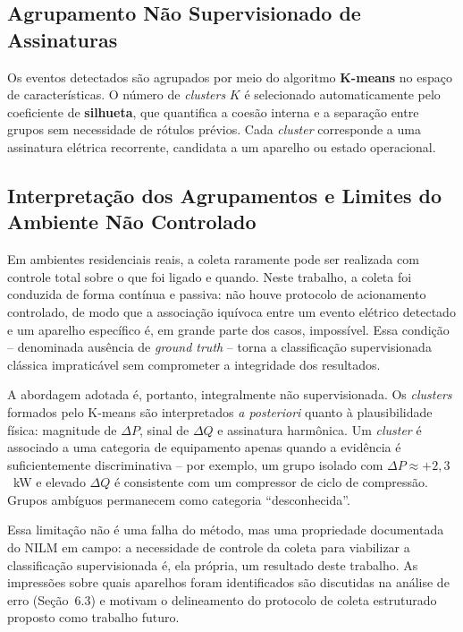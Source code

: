 \documentclass[12pt]{article}
\begin{document}
\subsection{Agrupamento N\~ao Supervisionado de Assinaturas}

Os eventos detectados s\~ao agrupados por meio do algoritmo \textbf{K-means} no
espa\c{c}o de caracter\'isticas. O n\'umero de \textit{clusters} $K$ \'e
selecionado automaticamente pelo coeficiente de \textbf{silhueta}, que quantifica
a coes\~ao interna e a separa\c{c}\~ao entre grupos sem necessidade de
r\'otulos pr\'evios. Cada \textit{cluster} corresponde a uma assinatura
el\'etrica recorrente, candidata a um aparelho ou estado operacional.

\subsection{Interpretação dos Agrupamentos e Limites do Ambiente N\~ao Controlado}

Em ambientes residenciais reais, a coleta raramente pode ser realizada com
controle total sobre o que foi ligado e quando. Neste trabalho, a coleta foi
conduzida de forma cont\'inua e passiva: n\~ao houve protocolo de acionamento
controlado, de modo que a associa\c{c}\~ao iqu\'ivoca entre um evento el\'etrico
detectado e um aparelho espec\'ifico \'e, em grande parte dos casos, imposs\'ivel.
Essa condi\c{c}\~ao -- denominada aus\^encia de \textit{ground truth} -- torna a
classifica\c{c}\~ao supervisionada cl\'assica impratic\'avel sem comprometer a
integridade dos resultados.

A abordagem adotada \'e, portanto, integralmente n\~ao supervisionada. Os
\textit{clusters} formados pelo K-means s\~ao interpretados \textit{a posteriori}
quanto \`a plausibilidade f\'isica: magnitude de $\Delta P$, sinal de $\Delta Q$
e assinatura harm\^onica. Um \textit{cluster} \'e associado a uma categoria de
equipamento apenas quando a evid\^encia \'e suficientemente discriminativa -- por
exemplo, um grupo isolado com $\Delta P \approx +2{,}3$~kW e elevado $\Delta Q$
\'e consistente com um compressor de ciclo de compress\~ao. Grupos amb\'iguos
permanecem como categoria ``desconhecida''.

Essa limita\c{c}\~ao n\~ao \'e uma falha do m\'etodo, mas uma propriedade
documentada do NILM em campo: a necessidade de controle da coleta para viabilizar
a classifica\c{c}\~ao supervisionada \'e, ela pr\'opria, um resultado deste
trabalho. As impress\~oes sobre quais aparelhos foram identificados s\~ao
discutidas na an\'alise de erro (Se\c{c}\~ao~6.3) e motivam o delineamento do
protocolo de coleta estruturado proposto como trabalho futuro.
\end{document}
